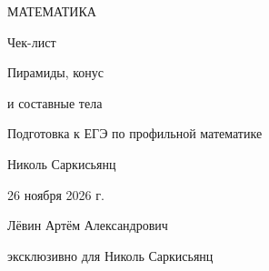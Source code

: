 \documentclass[a4paper,12pt]{article}
\begin{document}
\begin{titlepage}
\centering
\vspace*{26mm}
{\Large\color{darkaccent} МАТЕМАТИКА\par}
\vspace{14mm}
{\Huge Чек-лист\par}
\vspace{10mm}
{\LARGE\color{accent} Пирамиды, конус\par и составные тела\par}
\vspace{13mm}
{\large Подготовка к ЕГЭ по профильной математике\par}
\vfill
{\large Николь Саркисьянц\par}
\vspace{10mm}
{26 ноября 2026 г.\par}
\vspace{16mm}
{\small Лёвин Артём Александрович\par эксклюзивно для Николь Саркисьянц\par}
\vspace{17mm}
\end{titlepage}
\setcounter{page}{1}
\end{document}
